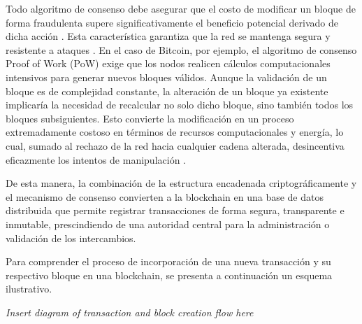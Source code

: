 Todo algoritmo de consenso debe asegurar que el costo de modificar un bloque de forma fraudulenta supere significativamente el beneficio potencial derivado de dicha acción \cite{satoshi2008bitcoin}. Esta característica garantiza que la red se mantenga segura y resistente a ataques \cite{buterin2013ethereum}. En el caso de Bitcoin, por ejemplo, el algoritmo de consenso Proof of Work (PoW) exige que los nodos realicen cálculos computacionales intensivos para generar nuevos bloques válidos. Aunque la validación de un bloque es de complejidad constante, la alteración de un bloque ya existente implicaría la necesidad de recalcular no solo dicho bloque, sino también todos los bloques subsiguientes. Esto convierte la modificación en un proceso extremadamente costoso en términos de recursos computacionales y energía, lo cual, sumado al rechazo de la red hacia cualquier cadena alterada, desincentiva eficazmente los intentos de manipulación \cite{satoshi2008bitcoin}.

De esta manera, la combinación de la estructura encadenada criptográficamente y el mecanismo de consenso convierten a la blockchain en una base de datos distribuida que permite registrar transacciones de forma segura, transparente e inmutable, prescindiendo de una autoridad central para la administración o validación de los intercambios.

Para comprender el proceso de incorporación de una nueva transacción y su respectivo bloque en una blockchain, se presenta a continuación un esquema ilustrativo.

\begin{block}[todo] %
    \textit{Insert diagram of transaction and block creation flow here}
\end{block}

